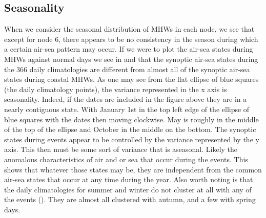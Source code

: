 \documentclass[a4paper,10pt,review]{elsarticle}
\begin{document}



\subsection{Seasonality}
When we consider the seasonal distribution of MHWs in each node, we see that except for node 6, there appears to be no consistency in the season during which a certain air-sea pattern may occur. If we were to plot the air-sea states during MHWs against normal days we see in  and  that the synoptic air-sea states during the 366 daily climatologies are different from almost all of the synoptic air-sea states during coastal MHWs. As one may see from the flat ellipse of blue squares (the daily climatology points), the variance represented in the x axis is seasonality. Indeed, if the dates are included in the figure above they are in a nearly contiguous state. With January 1st in the top left edge of the ellipse of blue squares with the dates then moving clockwise. May is roughly in the middle of the top of the ellipse and October in the middle on the bottom. The synoptic states during events appear to be controlled by the variance represented by the y axis. This then must be some sort of variance that is aseasonal. Likely the anomalous characteristics of air and or sea that occur during the events. This shows that whatever those states may be, they are independent from the common air-sea states that occur at any time during the year. Also worth noting is that the daily climatologies for summer and winter do not cluster at all with any of the events (). They are almost all clustered with autumn, and a few with spring days.
\end{document}
